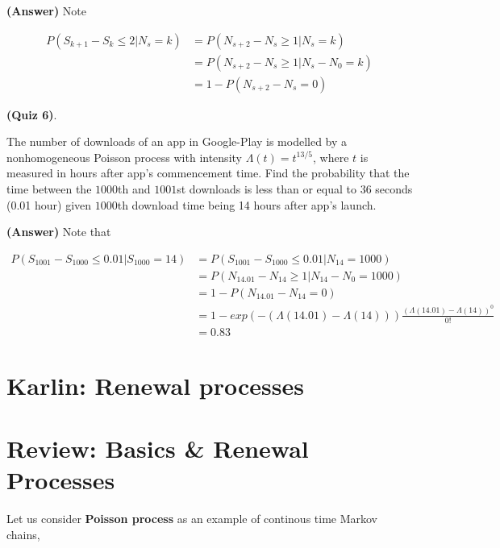 \documentclass[12pt]{article}
\theoremstyle{nonumberbreak}
\begin{document}
\textbf{(Answer)} Note


$$
\begin{aligned}
P(S_{k+1} - S_k \le 2 | N_s = k) &= P(N_{s+2} - N_s \ge 1| N_s = k) \\[8pt]
&= P(N_{s+2} - N_s \ge 1 | N_s - N_0 = k) \\[8pt]
&= 1 - P(N_{s+2} - N_s = 0)
\end{aligned}
$$


\textbf{(Quiz 6)}. 

The number of downloads of an app in Google-Play is modelled by a nonhomogeneous Poisson process with intensity $\Lambda(t)=t^{13/5}$, where $t$ is measured in hours after app's commencement time. Find the probability that the time between the $1000$th and $1001$st downloads is less than or equal to $36$ seconds (0.01 hour) given $1000$th download time being 14 hours after app's launch.


\textbf{(Answer)} Note that

$$
\begin{aligned}
P(S_{1001} - S_{1000} \le 0.01 | S_{1000} = 14) &= P(S_{1001} - S_{1000} \le 0.01 | N_{14} = 1000) \\[8pt]
&= P( N_{14.01} - N_{14} \ge 1 | N_{14} - N_0 = 1000) \\[8pt]
&= 1- P( N_{14.01} - N_{14} = 0 ) \\[8pt]
&= 1- exp(-(\Lambda(14.01) - \Lambda(14)) ) \frac{(\Lambda(14.01) - \Lambda(14))^0}{0!} \\[8pt]
&= 0.83
\end{aligned}
$$





\pagebreak
\section*{Karlin: Renewal processes}
\setcounter{section}{0}


\section{Review: Basics \& Renewal Processes}



Let us consider \textbf{Poisson process} as an example of continous time Markov chains,
\end{document}
